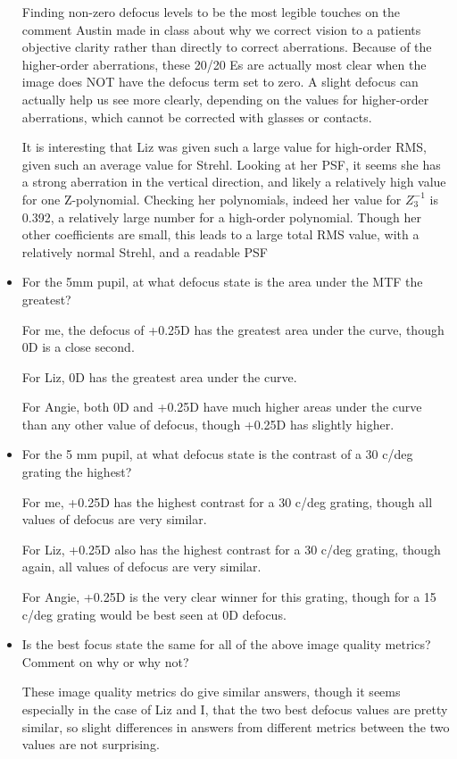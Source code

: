 \documentclass{article}
\begin{document}
\begin{itemize}
Finding non-zero defocus levels to be the most legible touches on the comment Austin made in class about why we correct vision to a patients objective clarity rather than directly to correct aberrations. Because of the higher-order aberrations, these 20/20 Es are actually most clear when the image does NOT have the defocus term set to zero. A slight defocus can actually help us see more clearly, depending on the values for higher-order aberrations, which cannot be corrected with glasses or contacts.

It is interesting that Liz was given such a large value for high-order RMS, given such an average value for Strehl. Looking at her PSF, it seems she has a strong aberration in the vertical direction, and likely a relatively high value for one Z-polynomial. Checking her polynomials, indeed her value for $Z_3^{-1}$ is 0.392, a relatively large number for a high-order polynomial. Though her other coefficients are small, this leads to a large total RMS value, with a relatively normal Strehl, and a readable PSF

\item For the 5mm pupil, at what defocus state is the area under the MTF the greatest?

For me, the defocus of +0.25D has the greatest area under the curve, though 0D is a close second.

For Liz, 0D has the greatest area under the curve.

For Angie, both 0D and +0.25D have much higher areas under the curve than any other value of defocus, though +0.25D has slightly higher.

\item For the 5 mm pupil, at what defocus state is the contrast of a 30 c/deg grating the highest?

For me, +0.25D has the highest contrast for a 30 c/deg grating, though all values of defocus are very similar.

For Liz, +0.25D also has the highest contrast for a 30 c/deg grating, though again, all values of defocus are very similar.

For Angie, +0.25D is the very clear winner for this grating, though for a 15 c/deg grating would be best seen at 0D defocus.

\item Is the best focus state the same for all of the above image quality metrics?
Comment on why or why not?

These image quality metrics do give similar answers, though it seems especially in the case of Liz and I, that the two best defocus values are pretty similar, so slight differences in answers from different metrics between the two values are not surprising.


\end{itemize}
\end{document}
